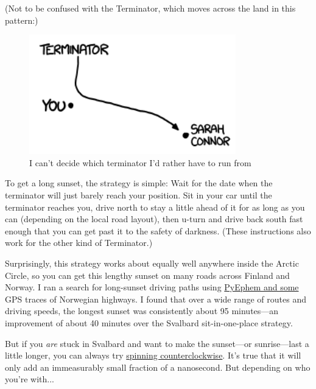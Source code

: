 {(Not to be confused with the Terminator, which moves across the land in this pattern:)}

\begin{figure}[!htbp]
\centering
\includegraphics[scale=0.5, max width=0.8\textwidth]{imgs/a/42/sunset_terminator_2.png}
\caption{I can’t decide which terminator I’d rather have to run from}
\end{figure}

{To get a long sunset, the strategy is simple: Wait for the date when the terminator will just barely reach your position. Sit in your car until the terminator reaches you, drive north to stay a little ahead of it for as long as you can (depending on the local road layout), then u-turn and drive back south fast enough that you can get past it to the safety of darkness. (These instructions also work for the other kind of Terminator.)}

{Surprisingly, this strategy works about equally well anywhere inside the Arctic Circle, so you can get this lengthy sunset on many roads across Finland and Norway. I ran a search for long-sunset driving paths using \href{http://rhodesmill.org/pyephem/}{PyEphem and some} GPS traces of Norwegian highways. I found that over a wide range of routes and driving speeds, the longest sunset was consistently about 95 minutes—an improvement of about 40 minutes over the Svalbard sit-in-one-place strategy.}

{But if you \emph{are} stuck in Svalbard and want to make the sunset—or sunrise—last a little longer, you can always try \href{http://xkcd.com/162/}{spinning counterclockwise}. It’s true that it will only add an immeasurably small fraction of a nanosecond. But depending on who you’re with...}

